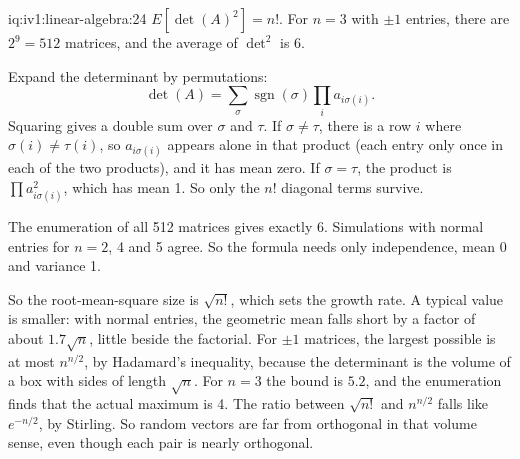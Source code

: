 \begin{solution}{iq:iv1:linear-algebra:24}
$E[\det(A)^2] = n!$. For $n = 3$ with $\pm 1$ entries, there are $2^9 = 512$ matrices, and the average of $\det^2$ is 6.

Expand the determinant by permutations:
\[
\det(A) = \sum_\sigma \operatorname{sgn}(\sigma)\prod_i a_{i\sigma(i)}.
\]
Squaring gives a double sum over $\sigma$ and $\tau$. If $\sigma \ne \tau$, there is a row $i$ where $\sigma(i) \ne \tau(i)$, so $a_{i\sigma(i)}$ appears alone in that product (each entry only once in each of the two products), and it has mean zero. If $\sigma = \tau$, the product is $\prod a_{i\sigma(i)}^2$, which has mean 1. So only the $n!$ diagonal terms survive.

The enumeration of all 512 matrices gives exactly 6. Simulations with normal entries for $n = 2$, 4 and 5 agree. So the formula needs only independence, mean 0 and variance 1.

So the root-mean-square size is $\sqrt{n!}$, which sets the growth rate. A typical value is smaller: with normal entries, the geometric mean falls short by a factor of about $1.7\sqrt{n}$, little beside the factorial. For $\pm 1$ matrices, the largest possible is at most $n^{n/2}$, by Hadamard's inequality, because the determinant is the volume of a box with sides of length $\sqrt{n}$. For $n = 3$ the bound is $5.2$, and the enumeration finds that the actual maximum is 4. The ratio between $\sqrt{n!}$ and $n^{n/2}$ falls like $e^{-n/2}$, by Stirling. So random vectors are far from orthogonal in that volume sense, even though each pair is nearly orthogonal.

\end{solution}


